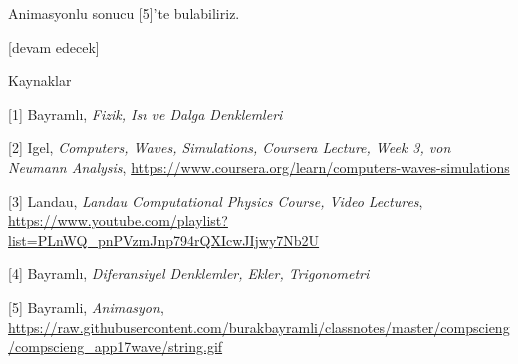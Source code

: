 \documentclass[12pt,fleqn]{article}\usepackage{../../common}
\begin{document}
Animasyonlu sonucu [5]'te bulabiliriz.

[devam edecek]

Kaynaklar

[1] Bayramlı, {\em Fizik, Isı ve Dalga Denklemleri}

[2] Igel, {\em Computers, Waves, Simulations, Coursera Lecture, Week 3, von Neumann Analysis},
    \url{https://www.coursera.org/learn/computers-waves-simulations}

[3] Landau, {\em Landau Computational Physics Course, Video Lectures},
    \url{https://www.youtube.com/playlist?list=PLnWQ_pnPVzmJnp794rQXIcwJIjwy7Nb2U}

[4] Bayramlı, {\em Diferansiyel Denklemler, Ekler, Trigonometri}

[5] Bayramli, {\em Animasyon},
    \url{https://raw.githubusercontent.com/burakbayramli/classnotes/master/compscieng/compscieng_app17wave/string.gif}
\end{document}
